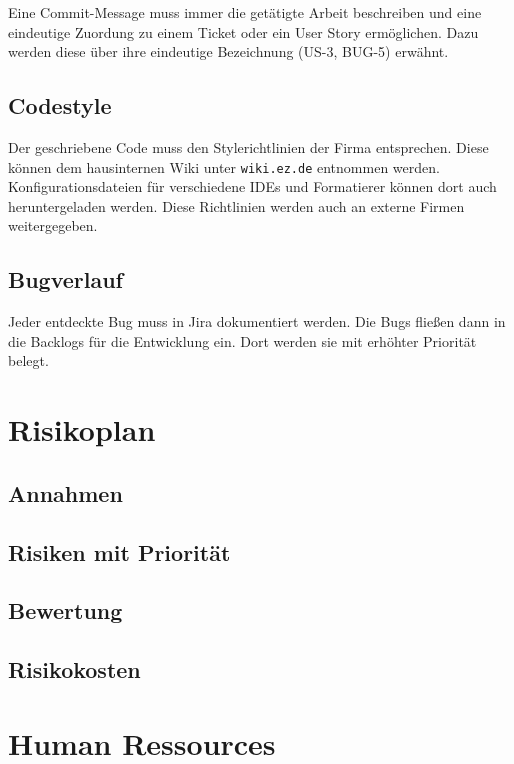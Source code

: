 Eine Commit-Message muss immer die getätigte Arbeit beschreiben und eine eindeutige Zuordung zu einem Ticket oder ein User Story ermöglichen. Dazu werden diese über ihre eindeutige Bezeichnung (US-3, BUG-5) erwähnt.
\subsection{Codestyle}
Der geschriebene Code muss den Stylerichtlinien der Firma entsprechen. Diese können dem hausinternen Wiki unter \texttt{wiki.ez.de} entnommen werden. Konfigurationsdateien für verschiedene IDEs und Formatierer können dort auch heruntergeladen werden. Diese Richtlinien werden auch an externe Firmen weitergegeben. 
\subsection{Bugverlauf}
Jeder entdeckte Bug muss in Jira dokumentiert werden. Die Bugs fließen dann in die Backlogs für die Entwicklung ein. Dort werden sie mit erhöhter Priorität belegt.
\section{Risikoplan}
\subsection{Annahmen} %



\subsection{Risiken mit Priorität} %


\subsection{Bewertung } %


\subsection{Risikokosten}


\section{Human Ressources}

